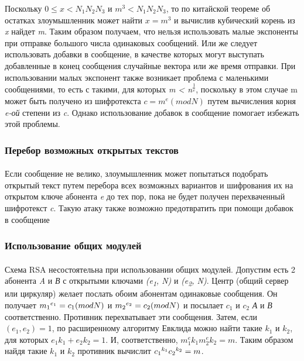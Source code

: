   Поскольку \textit{{$0 \le x < N_1 N_2 N_3$}} и \textit{{$m^3 < N_1 N_2 N_3$}}, то по китайской теореме об остатках злоумышленник может найти 
  \textit{{$x = m^3$}} и вычислив кубический корень из \textit{x} найдет \textit{m}. Таким образом получаем, что нельзя использовать малые экспоненты 
  при отправке большого числа одинаковых сообщений. Или же следует использовать добавки в сообщение, в качестве которых могут выступать добавленные в 
  конец сообщения случайные вектора или же время отправки. При использовании малых экспонент также возникает проблема с маленькими сообщениями, то есть 
  с такими, для которых \textit{m < n\textsuperscript{{$\frac{1}{e}$}}}, поскольку в этом случае m может быть получено из шифротекста 
  \textit{{$c = m^e(mod N)$}} путем вычисления корня \textit{e-ой} степени из \textit{c}. Однако использование добавок в сообщение помогает избежать этой 
  проблемы.

\subsubsection{Перебор возможных открытых текстов}

  \paragraph{} Если сообщение не велико, злоумышленник может попытаться подобрать открытый текст путем перебора всех возможных вариантов и 
  шифрования их на открытом ключе абонента \textit{e} до тех пор, пока не будет получен перехваченный шифротекст \textit{c}. Такую атаку также возможно 
  предотвратить при помощи добавок в сообщение

\subsubsection{Использование общих модулей}

  \paragraph{} Схема RSA несостоятельна при использовании общих модулей. Допустим есть 2 абонента \textit{A} и \textit{В} с открытыми ключами 
  \textit{(e\textsubscript{1}, N)} и \textit{(e\textsubscript{2}, N)}. Центр (общий сервер или циркуляр) желает послать обоим абонентам одинаковые сообщения. 
  Он получает \textit{{$m_1\textsuperscript{{$e_1$}} = c_1(mod N)$}} и \textit{{$m_2\textsuperscript{{$e_2$}} = c_2(mod N)$}} и посылает \textit{{$c_1$}} и 
  \textit{{$c_2$}} \textit{А} и \textit{В} соответственно. Противник перехватывает эти сообщения. Затем, если \textit{{$(e_1, e_2) = 1$}}, по 
  расширенному алгоритму Евклида можно найти такие \textit{{$k_1$}} и \textit{{$k_2$}}, для которых \textit{{$e_1 k_1 + e_2 k_2 = 1$}}. И, соответственно, 
  \textit{{$m_1^e k_1 m_2^e k_2 = m$}}. Таким образом найдя такие \textit{{$k_1$}} и \textit{{$k_2$}} противник вычислит 
  \textit{{$c_1\textsuperscript{{$k_1$}} c_2\textsuperscript{{$k_2$}} = m$}}.

